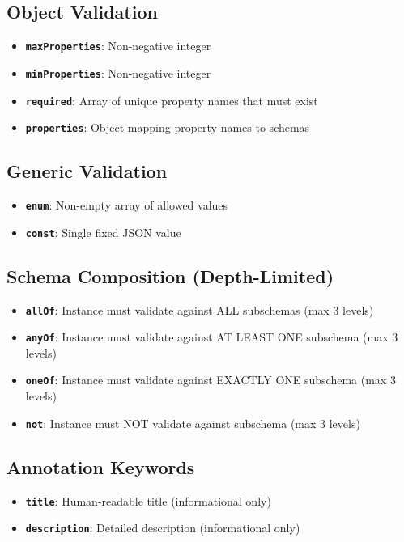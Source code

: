 \subsection{Object Validation}

\begin{itemize}
  \item \textbf{\texttt{maxProperties}}: Non-negative integer
  \item \textbf{\texttt{minProperties}}: Non-negative integer
  \item \textbf{\texttt{required}}: Array of unique property names that must exist
  \item \textbf{\texttt{properties}}: Object mapping property names to schemas
\end{itemize}

\subsection{Generic Validation}

\begin{itemize}
  \item \textbf{\texttt{enum}}: Non-empty array of allowed values
  \item \textbf{\texttt{const}}: Single fixed JSON value
\end{itemize}

\subsection{Schema Composition (Depth-Limited)}

\begin{itemize}
  \item \textbf{\texttt{allOf}}: Instance must validate against ALL subschemas (max 3 levels)
  \item \textbf{\texttt{anyOf}}: Instance must validate against AT LEAST ONE subschema (max 3 levels)
  \item \textbf{\texttt{oneOf}}: Instance must validate against EXACTLY ONE subschema (max 3 levels)
  \item \textbf{\texttt{not}}: Instance must NOT validate against subschema (max 3 levels)
\end{itemize}

\subsection{Annotation Keywords}

\begin{itemize}
  \item \textbf{\texttt{title}}: Human-readable title (informational only)
  \item \textbf{\texttt{description}}: Detailed description (informational only)
\end{itemize}

